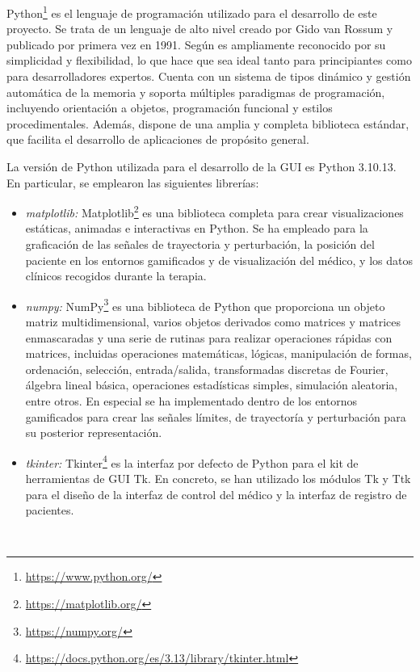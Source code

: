 Python\footnote{\url{https://www.python.org/}} es el lenguaje de programación utilizado para el desarrollo de este proyecto.
Se trata de un lenguaje de alto nivel creado por Gido van Rossum y publicado por primera vez en 1991.
Según \cite{perales9b} es ampliamente reconocido por su simplicidad y flexibilidad, lo que hace que sea ideal tanto para principiantes como para desarrolladores expertos. Cuenta con un sistema de tipos dinámico y gestión automática de la memoria y soporta múltiples paradigmas de programación, incluyendo orientación a objetos, programación funcional y estilos procedimentales. Además, dispone de una amplia y completa biblioteca estándar, que facilita el desarrollo de aplicaciones de propósito general.

La versión de Python utilizada para el desarrollo de la GUI es Python 3.10.13. En particular, se emplearon las siguientes librerías:

\begin{itemize}
    \item \textit{matplotlib:} Matplotlib\footnote{\url{https://matplotlib.org/}} es una biblioteca completa para crear visualizaciones estáticas, animadas e interactivas en Python. Se ha empleado para la graficación de las señales de trayectoria y perturbación, la posición del paciente en los entornos gamificados y de visualización del médico, y los datos clínicos recogidos durante la terapia.
    \item \textit{numpy:} NumPy\footnote{\url{https://numpy.org/}} es una biblioteca de Python que proporciona un objeto matriz multidimensional, varios objetos derivados como matrices y matrices enmascaradas y una serie de rutinas para realizar operaciones rápidas con matrices, incluidas operaciones matemáticas, lógicas, manipulación de formas, ordenación, selección, entrada/salida, transformadas discretas de Fourier, álgebra lineal básica, operaciones estadísticas simples, simulación aleatoria, entre otros. En especial se ha implementado dentro de los entornos gamificados para crear las señales límites, de trayectoría y perturbación para su posterior representación.
    \item \textit{tkinter:} Tkinter\footnote{\url{https://docs.python.org/es/3.13/library/tkinter.html}} es la interfaz por defecto de Python para el kit de herramientas de GUI Tk. En concreto, se han utilizado los módulos Tk y Ttk para el diseño de la interfaz de control del médico y la interfaz de registro de pacientes.
\end{itemize}\

